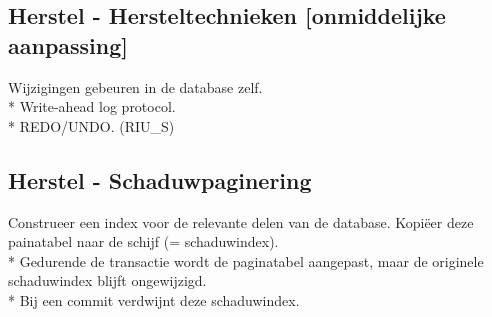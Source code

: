 \documentclass[10pt]{article}
\begin{document}
\subsection{Herstel - Hersteltechnieken [onmiddelijke aanpassing]}
Wijzigingen gebeuren in de database zelf.\\*
Write-ahead log protocol.\\*
REDO/UNDO. (RIU\_S)
\subsection{Herstel - Schaduwpaginering}
Construeer een index voor de relevante delen van de database. Kopi\"eer deze painatabel naar de schijf (= schaduwindex).\\*
Gedurende de transactie wordt de paginatabel aangepast, maar de originele schaduwindex blijft ongewijzigd.\\*
Bij een commit verdwijnt deze schaduwindex.
\end{document}
